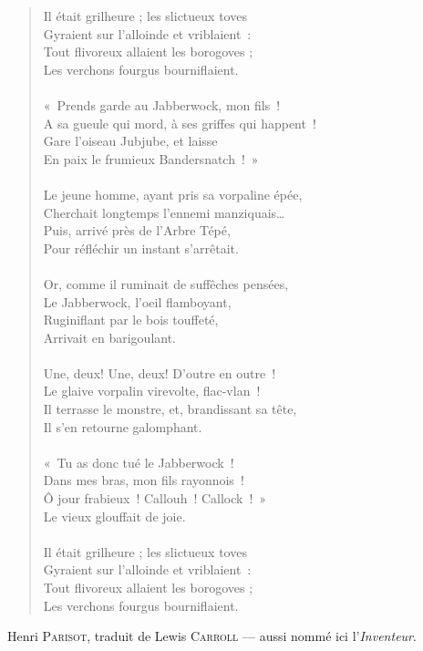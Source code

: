 {\begin{verse}
Il était grilheure ; les slictueux toves \\
Gyraient sur l'alloinde et vriblaient~: \\
Tout flivoreux allaient les borogoves ; \\
Les verchons fourgus bourniflaient. \\
~\\
«~Prends garde au Jabberwock, mon fils~! \\
A sa gueule qui mord, à ses griffes qui happent~! \\
Gare l'oiseau Jubjube, et laisse \\
En paix le frumieux Bandersnatch~!~» \\
~\\
Le jeune homme, ayant pris sa vorpaline épée, \\
Cherchait longtemps l'ennemi manziquais… \\
Puis, arrivé près de l'Arbre Tépé, \\
Pour réfléchir un instant s'arrêtait. \\
~\\
Or, comme il ruminait de suffêches pensées, \\
Le Jabberwock, l'oeil flamboyant, \\
Ruginiflant par le bois touffeté, \\
Arrivait en barigoulant. \\
~\\
Une, deux! Une, deux! D'outre en outre~! \\
Le glaive vorpalin virevolte, flac-vlan~! \\
Il terrasse le monstre, et, brandissant sa tête, \\
Il s'en retourne galomphant. \\
~\\
«~Tu as donc tué le Jabberwock~! \\
Dans mes bras, mon fils rayonnois~! \\
Ô jour frabieux~! Callouh~! Callock~!~» \\
Le vieux glouffait de joie. \\
~\\
Il était grilheure ; les slictueux toves \\
Gyraient sur l'alloinde et vriblaient~: \\
Tout flivoreux allaient les borogoves ; \\
Les verchons fourgus bourniflaient.
\end{verse}

\vspace{1cm}

Henri \textsc{Parisot}, traduit de Lewis \textsc{Carroll} — aussi nommé ici l’\textit{Inventeur}.
}



